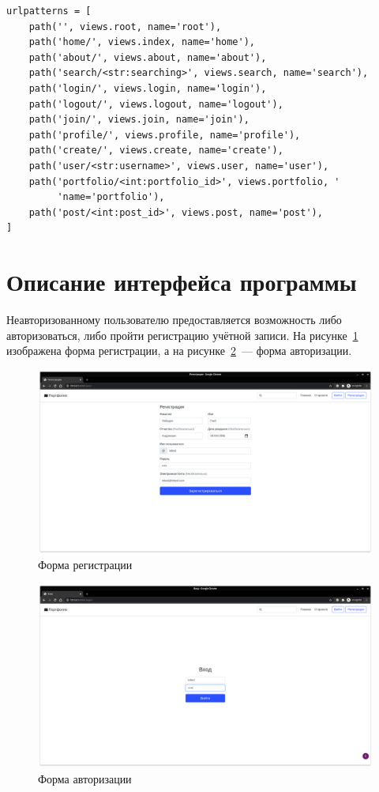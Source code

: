 \label{sub:menedzhment_url}
\begin{lstlisting}[caption={Менеджмент URL}, label=lst:urls]
urlpatterns = [
    path('', views.root, name='root'),
    path('home/', views.index, name='home'),
    path('about/', views.about, name='about'),
    path('search/<str:searching>', views.search, name='search'),
    path('login/', views.login, name='login'),
    path('logout/', views.logout, name='logout'),
    path('join/', views.join, name='join'),
    path('profile/', views.profile, name='profile'),
    path('create/', views.create, name='create'),
    path('user/<str:username>', views.user, name='user'),
    path('portfolio/<int:portfolio_id>', views.portfolio, '
         'name='portfolio'),
    path('post/<int:post_id>', views.post, name='post'),
]
\end{lstlisting}

\section{Описание интерфейса программы}%
\label{sec:opisanie_interfeisa_programmy}

Неавторизованному пользователю предоставляется возможность либо авторизоваться, либо пройти регистрацию учётной записи. На рисунке~\ref{img:scr_01} изображена форма регистрации, а на рисунке~\ref{img:scr_02}~--- форма авторизации.

\begin{figure}[H]
    \centering
    \includegraphics[scale=0.235]{images/scr_01.png}
    \caption{Форма регистрации}\label{img:scr_01}
\end{figure}

\begin{figure}[H]
    \centering
    \includegraphics[scale=0.235]{images/scr_02.png}
    \caption{Форма авторизации}\label{img:scr_02}
\end{figure}

